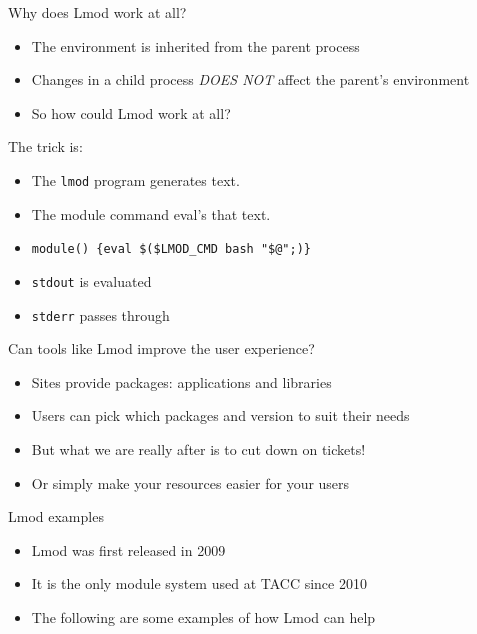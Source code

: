 \documentclass{beamer}
\begin{document}
\begin{frame}{Why does Lmod work at all?}
  \begin{itemize}
    \item The environment is inherited from the parent process
    \item Changes in a child process \emph{DOES NOT} affect the
      parent's environment
    \item So how could Lmod work at all?
  \end{itemize}
\end{frame}

\begin{frame}{The trick is:}
  \begin{itemize}
    \item The \texttt{lmod} program generates text.
    \item The module command eval's that text.
    \item \texttt{module() \{eval \$(\$LMOD\_CMD bash "\$@";)\}}
    \item \texttt{stdout} is evaluated
    \item \texttt{stderr} passes through
  \end{itemize}
\end{frame}


\begin{frame}{Can tools like Lmod improve the user experience?}
  \begin{itemize}
    \item Sites provide packages: applications and libraries
    \item Users can pick which packages and version to suit their needs
    \item But what we are really after is to cut down on tickets!
    \item Or simply make your resources easier for your users
  \end{itemize}
\end{frame}

\begin{frame}{Lmod examples}
  \begin{itemize}
    \item Lmod was first released in 2009
    \item It is the only module system used at TACC since 2010
    \item The following are some examples of how Lmod can help
  \end{itemize}
\end{frame}
\end{document}
